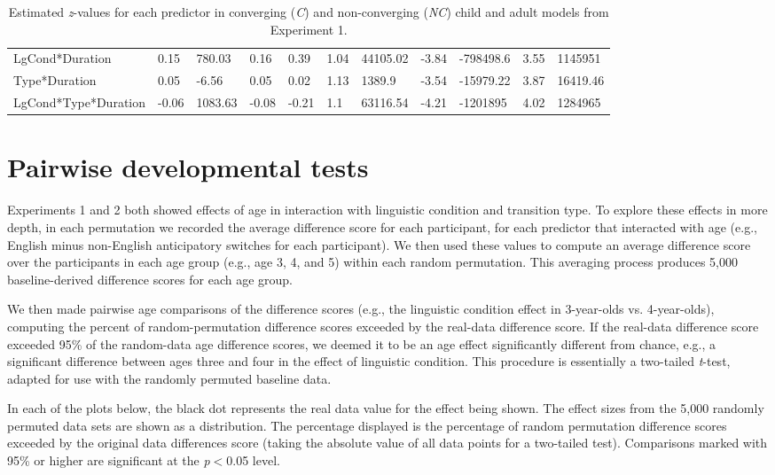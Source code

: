 \documentclass[authoryear, 12pt]{elsarticle}
\begin{document}
\begin{table}
\begin{scriptsize}
\begin{tabular}{lllllllllll}
    LgCond*Duration			& 0.15	& 780.03	& 0.16	& 0.39	& 1.04	& 44105.02	& -3.84	& -798498.6	& 3.55	& 1145951	\\
    Type*Duration 				& 0.05	& -6.56		& 0.05	& 0.02	& 1.13	& 1389.9	& -3.54	& -15979.22	& 3.87	& 16419.46	\\
    LgCond*Type*Duration	& -0.06	& 1083.63	& -0.08	& -0.21	& 1.1		& 63116.54	& -4.21	& -1201895		& 4.02	& 1284965	\\
    \hline
  \end{tabular}
  \caption{Estimated \textit{z}-values for each predictor in converging (\textit{C}) and non-converging (\textit{NC}) child and adult models from Experiment 1. }
\label{tab:nonconv_e1}
 \end{scriptsize}
\end{table}

\section{Pairwise developmental tests}
\label{sec:pairwisedev}
\setcounter{figure}{0}
Experiments 1 and 2 both showed effects of age in interaction with linguistic condition and transition type. To explore these effects in more depth, in each permutation we recorded the average difference score for each participant, for each predictor that interacted with age (e.g., English minus non-English anticipatory switches for each participant). We then used these values to compute an average difference score over the participants in each age group (e.g., age 3, 4, and 5) within each random permutation. This averaging process produces 5,000 baseline-derived difference scores for each age group.

We then made pairwise age comparisons of the difference scores (e.g., the linguistic condition effect in 3-year-olds vs. 4-year-olds), computing the percent of random-permutation difference scores exceeded by the real-data difference score. If the real-data difference score exceeded 95\% of the random-data age difference scores, we deemed it to be an age effect significantly different from chance, e.g., a significant difference between ages three and four in the effect of linguistic condition. This procedure is essentially a two-tailed \textit{t}-test, adapted for use with the randomly permuted baseline data.

In each of the plots below, the black dot represents the real data value for the effect being shown. The effect sizes from the 5,000 randomly permuted data sets are shown as a distribution. The percentage displayed is the percentage of random permutation difference scores exceeded by the original data differences score (taking the absolute value of all data points for a two-tailed test). Comparisons marked with 95\% or higher are significant at the \textit{p}$<$0.05 level. 
\end{document}
